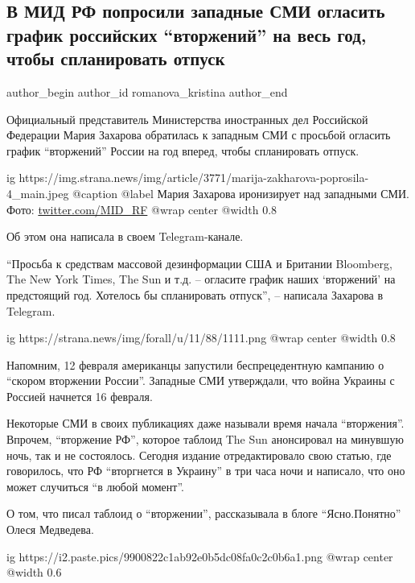  
 
 
 
 
 
\subsection{В МИД РФ попросили западные СМИ огласить график российских \enquote{вторжений} на весь год, чтобы спланировать отпуск}
\label{sec:15_02_2022.stz.news.ua.strana.4.zaharova_grafik_vtorzhenij}
 
\ifcmt
 author_begin
   author_id romanova_kristina
 author_end
\fi

Официальный представитель Министерства иностранных дел Российской Федерации
Мария Захарова обратилась к западным СМИ с просьбой огласить график \enquote{вторжений}
России на год вперед, чтобы спланировать отпуск.

\ifcmt
  ig https://img.strana.news/img/article/3771/marija-zakharova-poprosila-4_main.jpeg
	@caption @label Мария Захарова иронизирует над западными СМИ. Фото: \url{twitter.com/MID_RF}
  @wrap center
  @width 0.8
\fi

Об этом она написала в своем Telegram-канале.

\enquote{Просьба к средствам массовой дезинформации США и Британии Bloomberg, The New
York Times, The Sun и т.д. – огласите график наших \enquote{вторжений} на предстоящий
год. Хотелось бы спланировать отпуск}, – написала Захарова в Telegram.

\ifcmt
  ig https://strana.news/img/forall/u/11/88/1111.png
  @wrap center
  @width 0.8
\fi

Напомним, 12 февраля американцы запустили беспрецедентную кампанию о \enquote{скором
вторжении России}. Западные СМИ утверждали, что война Украины с Россией
начнется 16 февраля. 

Некоторые СМИ в своих публикациях даже называли время начала \enquote{вторжения}.
Впрочем, \enquote{вторжение РФ}, которое таблоид The Sun анонсировал на минувшую ночь,
так и не состоялось. Сегодня издание отредактировало свою статью, где
говорилось, что РФ \enquote{вторгнется в Украину} в три часа ночи и написало, что оно
может случиться \enquote{в любой момент}. 

О том, что писал таблоид о \enquote{вторжении}, рассказывала в блоге \enquote{Ясно.Понятно}
Олеся Медведева.

\ifcmt
  ig https://i2.paste.pics/9900822c1ab92e0b5dc08fa0c2c0b6a1.png
  @wrap center
  @width 0.6
\fi
